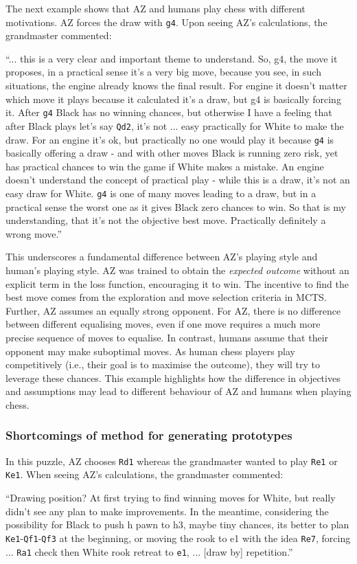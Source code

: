 \documentclass{article}
\newcommand{\ct}[1]{\texttt{#1}}
\begin{document}
The next example shows that AZ and humans play chess with different motivations.
AZ forces the draw with \ct{g4}. Upon seeing AZ's calculations, the grandmaster commented:
\begin{displayquote}
``... this is a very clear and important theme to understand. So, g4, the move it proposes, in a practical sense it’s a very big move, because you see, in such situations, the engine already knows the final result. For engine it doesn’t matter which move it plays because it calculated it’s a draw, but g4 is basically forcing it. After \ct{g4} Black has no winning chances, but otherwise I have a feeling that after Black plays let’s say \ct{Qd2}, it’s not ... easy practically for White to make the draw. For an engine it’s ok, but practically no one would play it because \ct{g4} is basically offering a draw - and with other moves Black is running zero risk, yet has practical chances to win the game if White makes a mistake. An engine doesn’t understand the concept of practical play - while this is a draw, it’s not an easy draw for White. \ct{g4} is one of many moves leading to a draw, but in a practical sense the worst one as it gives Black zero chances to win. So that is my understanding, that it’s not the objective best move. Practically definitely a wrong move.''
\end{displayquote}

This underscores a fundamental difference between AZ's playing style and human's playing style. AZ was trained to obtain the \textit{expected outcome} without an explicit term in the loss function, encouraging it to win. The incentive to find the best move comes from the exploration and move selection criteria in MCTS. Further, AZ assumes an equally strong opponent. For AZ, there is no difference between different equalising moves, even if one move requires a much more precise sequence of moves to equalise. 
In contrast, humans assume that their opponent may make suboptimal moves. As human chess players play competitively (i.e., their goal is to maximise the outcome), they will try to leverage these chances. 
This example highlights how the difference in objectives and assumptions may lead to different behaviour of AZ and humans when playing chess.

\subsubsection*{Shortcomings of method for generating prototypes}
In this puzzle, AZ chooses \ct{Rd1} whereas the grandmaster wanted to play \ct{Re1} or \ct{Ke1}. When seeing AZ's calculations, the grandmaster commented:
\begin{displayquote}
``Drawing position? At first trying to find winning moves for White, but really didn’t see any plan to make improvements. In the meantime, considering the possibility for Black to push h pawn to h3, maybe tiny
chances, its better to plan \ct{Ke1}-\ct{Qf1}-\ct{Qf3} at the beginning, or moving the rook to e1 with the idea \ct{Re7}, forcing ... \ct{Ra1} check then White rook retreat to \ct{e1}, ... [draw by] repetition.''
\end{displayquote}
\end{document}
